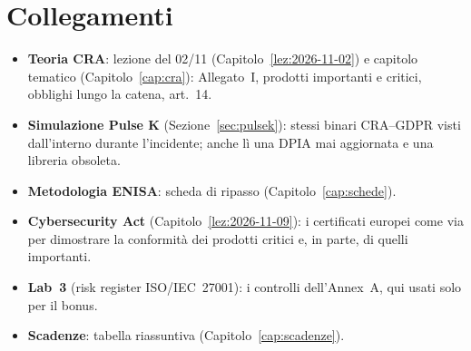 \section{Collegamenti}
\begin{itemize}
  \item \textbf{Teoria CRA}: lezione del 02/11 (Capitolo~\ref{lez:2026-11-02}) e capitolo tematico
    (Capitolo~\ref{cap:cra}): Allegato~I, prodotti importanti e critici, obblighi lungo la catena,
    art.~14.
  \item \textbf{Simulazione Pulse K} (Sezione~\ref{sec:pulsek}): stessi binari CRA--GDPR visti
    dall'interno durante l'incidente; anche lì una DPIA mai aggiornata e una libreria obsoleta.
  \item \textbf{Metodologia ENISA}: scheda di ripasso (Capitolo~\ref{cap:schede}).
  \item \textbf{Cybersecurity Act} (Capitolo~\ref{lez:2026-11-09}): i certificati europei come via per
    dimostrare la conformità dei prodotti critici e, in parte, di quelli importanti.
  \item \textbf{Lab~3} (risk register ISO/IEC~27001): i controlli dell'Annex~A, qui usati solo per il
    bonus.
  \item \textbf{Scadenze}: tabella riassuntiva (Capitolo~\ref{cap:scadenze}).
\end{itemize}

